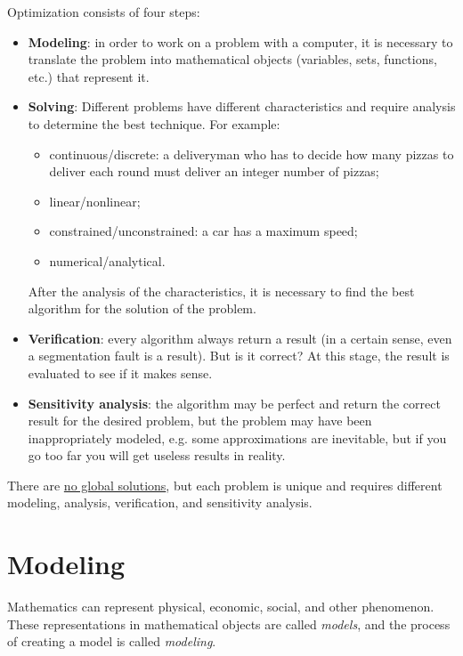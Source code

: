 Optimization consists of four steps:
\begin{itemize}
    \setlength\itemsep{.5em}

    \item \textbf{Modeling}: in order to work on a problem with a computer, it is necessary to translate the problem into mathematical objects (variables, sets, functions, etc.) that represent it.
    
    \item \textbf{Solving}: Different problems have different characteristics and require analysis to determine the best technique. For example: 
    \begin{itemize}
        \item continuous/discrete: a deliveryman who has to decide how many pizzas to deliver each round must deliver an integer number of pizzas;
        \item linear/nonlinear;
        \item constrained/unconstrained: a car has a maximum speed;
        \item numerical/analytical. 
    \end{itemize}
    After the analysis of the characteristics, it is necessary to find the best algorithm for the solution of the problem.

    \item \textbf{Verification}: every algorithm always return a result (in a certain sense, even a segmentation fault is a result). But is it correct? At this stage, the result is evaluated to see if it makes sense.
    
    \item \textbf{Sensitivity analysis}: the algorithm may be perfect and return the correct result for the desired problem, but the problem may have been inappropriately modeled, e.g. some approximations are inevitable, but if you go too far you will get useless results in reality.
\end{itemize}

There are \underline{no global solutions}, but each problem is unique and requires different modeling, analysis, verification, and sensitivity analysis.



\section{Modeling}
\label{sec:op.modeling}

Mathematics can represent physical, economic, social, and other phenomenon. These representations in mathematical objects are called \textit{models}, and the process of creating a model is called \textit{modeling}.

